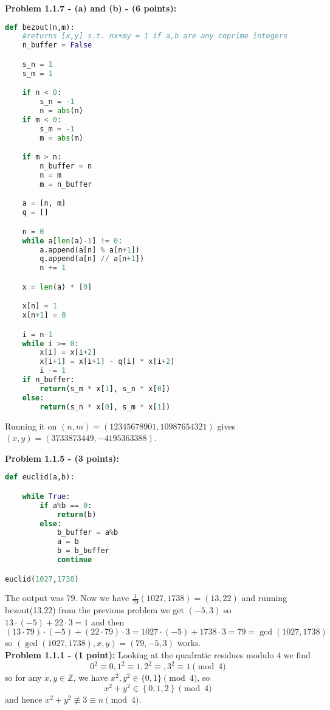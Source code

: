 \documentclass[a4paper]{article}
\begin{document}
\textbf{Problem 1.1.7 - (a) and (b) - (6 points):}

\begin{lstlisting}[language=Python]
def bezout(n,m):
    #returns [x,y] s.t. nx+my = 1 if a,b are any coprime integers
    n_buffer = False

    s_n = 1
    s_m = 1

    if n < 0:
        s_n = -1
        n = abs(n)
    if m < 0:
        s_m = -1
        m = abs(m)

    if m > n:
        n_buffer = n
        n = m
        m = n_buffer

    a = [n, m]
    q = []

    n = 0
    while a[len(a)-1] != 0:
        a.append(a[n] % a[n+1])
        q.append(a[n] // a[n+1])
        n += 1

    x = len(a) * [0]

    x[n] = 1
    x[n+1] = 0

    i = n-1
    while i >= 0:
        x[i] = x[i+2]
        x[i+1] = x[i+1] - q[i] * x[i+2]
        i -= 1
    if n_buffer:
        return(s_m * x[1], s_n * x[0])
    else:
        return(s_n * x[0], s_m * x[1])
\end{lstlisting}
Running it on $(n,m) = (12345678901, 10987654321)$ gives
$(x,y) = (3733873449, -4195363388)$.\\
\linebreak



\textbf{Problem 1.1.5 - (3 points):}
\begin{lstlisting}[language=Python]
    def euclid(a,b):

    while True:
        if a%b == 0:
            return(b)
        else:
            b_buffer = a%b
            a = b
            b = b_buffer
            continue

euclid(1027,1738)            
\end{lstlisting}
The output was $79$.  Now we have $\frac{1}{79}\left( 1027,1738 \right) 
= (13, 22)$ and running
bezout(13,22) from the previous problem we get $(-5,3)$ so
$13 \cdot (-5) + 22 \cdot 3 = 1$ and then
\[
    (13 \cdot 79) \cdot (-5) + (22 \cdot 79) \cdot 3 
    = 1027 \cdot (-5) + 1738 \cdot 3 = 79 = \gcd(1027,1738)
\] 
so
$(\gcd(1027,1738), x, y) = (79, -5, 3)$ works.\\
\linebreak
\textbf{Problem 1.1.1 - (1 point):}
Looking at the quadratic residues modulo $4$ we find
$$0^2 \equiv 0, 1^2 \equiv 1, 2^2 \equiv, 3^2 \equiv 1 \pmod{4}$$
so for any $x,y \in \mathbb{Z}$, we have $x^2,y^2 \in \{0,1\} \pmod{4}$, so
\[
    x^2 + y^2 \in \left\{ 0,1,2 \right\} \pmod{4}
\] 
and hence $x^2 + y^2 \not \equiv 3 \equiv n \pmod{4}$.
\end{document}
